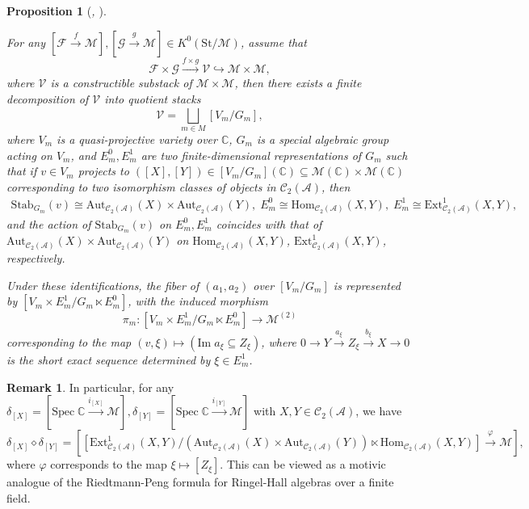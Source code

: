 \documentclass[12pt]{amsart}
\newtheorem{proposition}[theorem]{Proposition}
\theoremstyle{definition}
\newtheorem{remark}[theorem]{Remark}
\numberwithin{equation}{section}
\begin{document}
\begin{proposition}[{\itshape\cite[Proposition 5.15]{Joyce07}, \cite[Proposition 4.10]{FLX24}}]\;
\label{Motivic Riedtmann-Peng}

For any $ [\mathcal{F} \xrightarrow{f} \mathcal{M}], [\mathcal{G} \xrightarrow{g} \mathcal{M}] \in K^0(\mathrm{St}/\mathcal{M}) $, assume that
\[\mathcal{F} \times \mathcal{G} \xrightarrow{f \times g} \mathcal{V} \hookrightarrow \mathcal{M} \times \mathcal{M},\]
where $ \mathcal{V} $ is a constructible substack of $ \mathcal{M} \times \mathcal{M} $, then there exists a finite decomposition of $ \mathcal{V} $ into quotient stacks
\[\mathcal{V}= \bigsqcup_{m \in M}[V_m/G_m],\]
where $ V_m $ is a quasi-projective variety over $ \mathbb{C} $, $ G_m $ is a special algebraic group acting on $ V_m $, and $ E_m^0, E_m^1 $ are two finite-dimensional representations of $ G_m $ such that if $ v \in V_m $ projects to $ ([X], [Y]) \in [V_m/G_m](\mathbb{C}) \subseteq \mathcal{M}(\mathbb{C}) \times \mathcal{M}(\mathbb{C}) $ corresponding to two isomorphism classes of objects in $ \mathcal{C}_2(\mathcal{A}) $, then
    \begin{align*}
        \mathrm{Stab}_{G_m}(v) \cong \mathrm{Aut}_{\mathcal{C}_2(\mathcal{A})}(X) \times \mathrm{Aut}_{\mathcal{C}_2(\mathcal{A})}(Y),\;E_m^0 \cong \mathrm{Hom}_{\mathcal{C}_2(\mathcal{A})}(X,Y), \; E_m^1 \cong \mathrm{Ext}^1_{\mathcal{C}_2(\mathcal{A})}(X,Y),
    \end{align*}
    and the action of $  \mathrm{Stab}_{G_m}(v) $ on $ E_m^0, E_m^1 $ coincides with that of $ \mathrm{Aut}_{\mathcal{C}_2(\mathcal{A})}(X) \times \mathrm{Aut}_{\mathcal{C}_2(\mathcal{A})}(Y) $ on $ \mathrm{Hom}_{\mathcal{C}_2(\mathcal{A})}(X,Y) $, $ \mathrm{Ext}^1_{\mathcal{C}_2(\mathcal{A})}(X,Y) $, respectively.

   Under these identifications, the fiber of $ (a_1,a_2) $ over $ [V_m/G_m] $ is represented by $ [V_m\times E_m^1/G_m\ltimes E_m^0] $, with the induced morphism
   \[\pi_m: [V_m\times E_m^1/G_m\ltimes E_m^0] \to \mathcal M^{(2)}\]
   corresponding to the map $ (v, \xi) \mapsto (\mathrm{Im}\;a_{\xi}  \subseteq Z_{\xi}) $, where $ 0 \to Y \xrightarrow{a_{\xi}} Z_{\xi} \xrightarrow{b_{\xi}} X \to 0 $ is the short exact sequence determined by $ \xi \in E_m^1 $.

\end{proposition}

\begin{remark}
    \label{Motivic Riedtmann-Peng (XY)}
    In particular, for any $ \delta_{[X]} = [\mathrm{Spec}\;\mathbb{C} \xrightarrow{i_{[X]}} \mathcal{M} ], \delta_{[Y]} = [\mathrm{Spec}\;\mathbb{C} \xrightarrow{i_{[Y]}} \mathcal{M} ]$ with $ X,Y \in \mathcal{C}_2(\mathcal{A}) $, we have
    \[\delta_{[X]} \diamond \delta_{[Y]} = [[\mathrm{Ext}^1_{\mathcal{C}_2(\mathcal{A})}(X,Y)/(\mathrm{Aut}_{\mathcal{C}_2(\mathcal{A})}(X) \times \mathrm{Aut}_{\mathcal{C}_2(\mathcal{A})}(Y)) \ltimes \mathrm{Hom}_{\mathcal{C}_2(\mathcal{A})}(X, Y)]\xrightarrow{\varphi} \mathcal{M}],\]
    where $ \varphi $ corresponds to the map $ \xi \mapsto [Z_{\xi}] $. 
    This can be viewed as a motivic analogue of the Riedtmann-Peng formula for Ringel-Hall algebras over a finite field. 
\end{remark}
\end{document}
